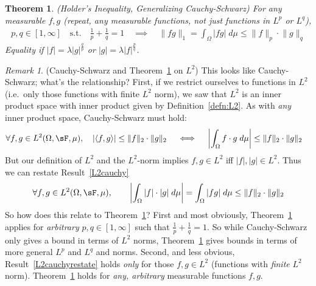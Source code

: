 \documentclass[12pt]{article}
\theoremstyle{plain}
\newtheorem{thm}{Theorem}[section]
\theoremstyle{definition}
\theoremstyle{remark}
\newtheorem*{rmk}{Remark}
\begin{document}
\begin{thm}
\label{thm:holder}
\emph{(Holder's Inequality, Generalizing Cauchy-Schwarz)}
For any measurable $f,g$ (repeat, \emph{any} measurable functions, not
just functions in $L^p$ or $L^q$),
\begin{align*}
  p,q\in[1,\infty]
  \quad \text{s.t.}\quad
  \frac{1}{p}
  +
  \frac{1}{q}
  =1
  \quad\implies\quad
  \lVert fg\rVert_1 =
  \int_\Omega |fg| \; d\mu \leq
  \lVert f\rVert_p \cdot \lVert g\rVert_{q}
\end{align*}
Equality if $|f|=\lambda |g|^{\frac{q}{p}}$ or
$|g|=\lambda |f|^{\frac{p}{q}}$.
\end{thm}
\begin{rmk}(Cauchy-Schwarz and Theorem~\ref{thm:holder} on $L^2$)
This looks like Cauchy-Schwarz; what's the relationship?
First, if we restrict ourselves to functions in $L^2$ (i.e.\ only
those functions with finite $L^2$ norm), we saw that $L^2$ is an inner
product space with inner product given by Definition~\ref{defn:L2}. As
with \emph{any} inner product space, Cauchy-Schwarz must hold:
\begin{align}
  \forall f,g\in L^2(\Omega,\sF,\mu),\quad
  |\langle f,g\rangle|
  \leq \lVert f\rVert_2\cdot \lVert g\rVert_2
  \quad\iff\quad
  \left|
  \int_\Omega f\cdot g\;d\mu
  \right|
  &\leq \lVert f\rVert_2\cdot \lVert g\rVert_2
  \label{L2cauchy}
\end{align}
But our definition of $L^2$ and the $L^2$-norm implies $f,g\in L^2$
iff $|f|,|g|\in L^2$.
Thus we can restate Result~\ref{L2cauchy}
\begin{align}
  \forall f,g\in L^2(\Omega,\sF,\mu),\qquad
  \left| \int_\Omega |f|\cdot |g|\;d\mu \right|
  = \int_\Omega |fg|\;d\mu
  \leq \lVert f\rVert_2\cdot \lVert g\rVert_2
  \label{L2cauchyrestate}
\end{align}
So how does this relate to Theorem~\ref{thm:holder}?
First and most obviously, Theorem~\ref{thm:holder} applies for
\emph{arbitrary} $p, q\in[1,\infty]$ such that
$\frac{1}{p}+\frac{1}{q}=1$. So while Cauchy-Schwarz only gives a bound
in terms of $L^2$ norms, Theorem~\ref{thm:holder} gives bounds in terms
of more general $L^p$ and $L^q$ and norms.
Second, and less obvious, Result~\ref{L2cauchyrestate} holds \emph{only}
for those $f,g\in L^2$ (functions with \emph{finite} $L^2$ norm).
Theorem~\ref{thm:holder} holds for \emph{any, arbitrary} measurable
functions $f,g$.
\end{rmk}
\end{document}
